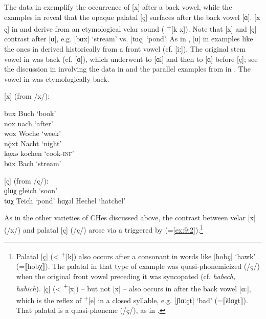 The data in  exemplify the occurrence of [x] after a back vowel, while the examples in  reveal that the opaque palatal [ç] surfaces after the back vowel [ɑ]. [x ç] in  and  derive from an etymological velar sound ( \textsuperscript{+}[k x]). Note that [x] and [ç] contrast after [ɑ], e.g. [bɑx] ‘stream’ vs. [tɑç] ‘pond’. As in ,  [ɑ] in examples like the ones in  derived historically from a front vowel (cf.  [iː]). The original stem vowel in  was back (cf.  [ɑ]), which underwent  to [ɑi] and then  to [ɑ] before [ç]; see the discussion in  involving the  data in  and the parallel examples from  in . The vowel in  was etymologically back.\largerpage

\ea%
\label{ex:9:24} [x] (from /x/):\\
\begin{xlist}
  \sn
bux  \tab [bux] \tab Buch \tab ‘book’ \\
nōx  \tab [noːx] \tab nach \tab ‘after’ \\
wox  \tab [wox] \tab Woche \tab ‘week’ \\
nǭxt \tab [nɔːxt] \tab Nacht \tab ‘night’ \\
kǫxə \tab [kɔxə] \tab kochen \tab ‘cook-\textsc{inf}’ \\
bɑx  \tab [bɑx] \tab Bach \tab ‘stream’ 
\end{xlist}
\ex%
\label{ex:9:25} [ç] (from /ç/):\\
\ea\label{ex:9:25a} ɡlɑχ \tab [glɑç] \tab gleich \tab ‘soon’ \\
    tɑχ \tab [tɑç] \tab Teich \tab ‘pond’ 
\ex\label{ex:9:25b} hɑχəl \tab [hɑçəl] \tab Hechel \tab ‘hatchel’ 
   \z
\z 


As in the other varieties of CHes discussed above, the contrast between velar [x] (/x/) and palatal [ç] (/ç/) arose via a  triggered by  (=\ref{ex:9:2}).\footnote{Palatal [ç] (< {\textsuperscript{+}}{[k]) also occurs after a consonant in words like [hobç] ‘hawk’ (=⟦hobχ⟧). The palatal in that type of example was quasi-phonemicized (/ç/) when the original front vowel preceding it was syncopated (cf.  \textit{habech, habich}). [ç] (<} {\textsuperscript{+}}{[x]) -- but not [x] -- also occurs in  after the back vowel [ɑː], which is the reflex of } \textsuperscript{+}[e] in a closed syllable, e.g. [ʃlɑːçt] ‘bad’ (=⟦šlɑχt⟧). That palatal is a quasi-phoneme (/ç/), as in .}

